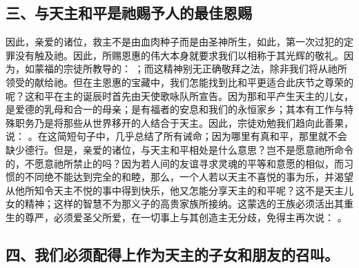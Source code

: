 
\subsection{三、与天主和平是祂赐予人的最佳恩赐}

因此，亲爱的诸位，救主不是由血肉种子而是由圣神所生，如此，第一次过犯的定罪没有触及祂。因此，所赐恩惠的伟大本身就要求我们以相称于其光辉的敬礼。因为，如蒙福的宗徒所教导的： ；而这精神别无正确敬拜之法，除非我们将从祂所领受的献给祂。但在主恩惠的宝藏中，我们怎能找到比和平更适合此庆节之尊荣的呢？这和平在主的诞辰时首先由天使歌咏队所宣告。因为那和平产生天主的儿女，是爱德的乳母和合一的母亲；是有福者的安息和我们的永恒家乡；其本有工作与特殊职务乃是将那些从世界移开的人结合于天主。因此，宗徒劝勉我们趋向此善果，说： 。在这简短句子中，几乎总结了所有诫命；因为哪里有真和平，那里就不会缺少德行。但是，亲爱的诸位，与天主和平相处是什么意思？岂不是愿意祂所命令的，不愿意祂所禁止的吗？因为若人间的友谊寻求灵魂的平等和意愿的相似，而习惯的不同绝不能达到完全的和睦，那么，一个人若以天主不喜悦的事为乐，并渴望从他所知令天主不悦的事中得到快乐，他又怎能分享天主的和平呢？这不是天主儿女的精神；这样的智慧不为那义子的高贵家族所接纳。这蒙选的王族必须活出其重生的尊严，必须爱圣父所爱，在一切事上与其创造主无分歧，免得主再次说： 。\par


\subsection{四、我们必须配得上作为天主的子女和朋友的召叫。}

